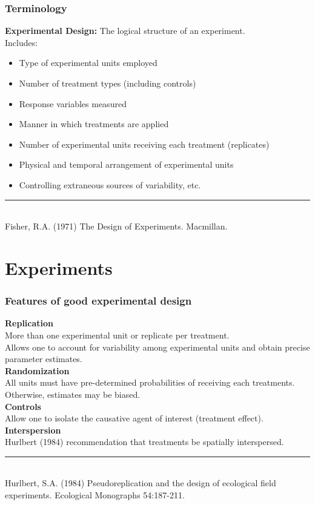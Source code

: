 \documentclass[color=usenames,dvipsnames]{beamer}\usepackage[]{graphicx}\usepackage[]{color}
\begin{document}
\begin{frame}
  \frametitle{Terminology}
  {\bf Experimental Design:} %
  The logical structure of an experiment. \\ %
  \vspace{6pt}
  \vfill  
  Includes:
  \begin{itemize}
    \item Type of experimental units employed
    \item Number of treatment types (including controls)
    \item Response variables measured
    \item Manner in which treatments are applied
    \item Number of experimental units receiving each treatment (replicates)
    \item Physical and temporal arrangement of experimental units
    \item Controlling extraneous sources of variability, etc.
  \end{itemize}
  \vfill
  \vspace{6pt}
  \rule[0mm]{1cm}{0.1mm} \\
  \footnotesize
  Fisher, R.A. (1971) The Design of Experiments. Macmillan. 
\end{frame}




\section{Experiments}


\begin{frame}
  \frametitle{Features of good experimental design}
  \pause
  \small
  {\bf Replication} \\
  More than one experimental unit or replicate per treatment. \\
  Allows one to account for variability among experimental units and
  obtain precise parameter estimates. \\
  \pause
  \vfill
  {\bf Randomization} \\
  All units must have pre-determined probabilities of receiving each
  treatments. Otherwise, estimates may be biased. \\
  \pause
  \vfill
  {\bf Controls} \\
  Allow one to isolate the causative agent of interest (treatment
  effect). \\ %
  \pause
  \vfill
  {\bf Interspersion} \\
  Hurlbert (1984) recommendation that treatments be spatially interspersed.  \\
  \vspace{1pt}
  \rule[0mm]{1cm}{0.1mm} \\
  \footnotesize
  Hurlbert, S.A. (1984) Pseudoreplication and the design of ecological field
  experiments.  Ecological Monographs 54:187-211.
\end{frame}
\end{document}
